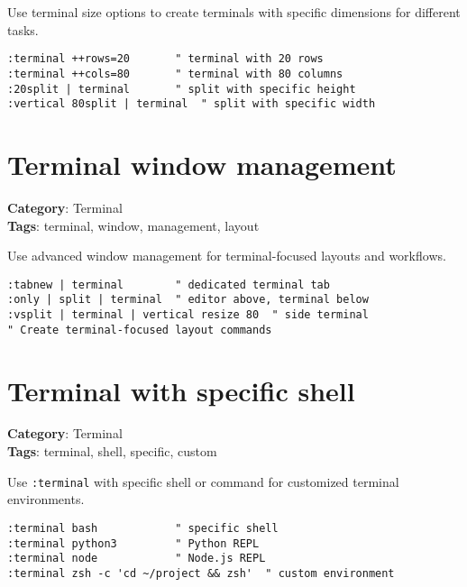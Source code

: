 {{{{{{{{{Use terminal size options to create terminals with specific dimensions for different tasks.

\begin{Exa*}{}
\begin{Verbatim}[fontsize=\footnotesize, breaklines, breakanywhere]
:terminal ++rows=20       " terminal with 20 rows
:terminal ++cols=80       " terminal with 80 columns
:20split | terminal       " split with specific height
:vertical 80split | terminal  " split with specific width
\end{Verbatim}
\end{Exa*}

\section{Terminal window management}

\textbf{Category}: Terminal\\ \textbf{Tags}: terminal, window, management, layout
\vspace{0.5cm}

Use advanced window management for terminal-focused layouts and workflows.

\begin{Exa*}{}
\begin{Verbatim}[fontsize=\footnotesize, breaklines, breakanywhere]
:tabnew | terminal        " dedicated terminal tab
:only | split | terminal  " editor above, terminal below
:vsplit | terminal | vertical resize 80  " side terminal
" Create terminal-focused layout commands
\end{Verbatim}
\end{Exa*}

\section{Terminal with specific shell}

\textbf{Category}: Terminal\\ \textbf{Tags}: terminal, shell, specific, custom
\vspace{0.5cm}

Use {\footnotesize \Verb§:terminal§} with specific shell or command for customized terminal environments.

\begin{Exa*}{}
\begin{Verbatim}[fontsize=\footnotesize, breaklines, breakanywhere]
:terminal bash            " specific shell
:terminal python3         " Python REPL
:terminal node            " Node.js REPL
:terminal zsh -c 'cd ~/project && zsh'  " custom environment
\end{Verbatim}
\end{Exa*}

}}}}}}}}}
